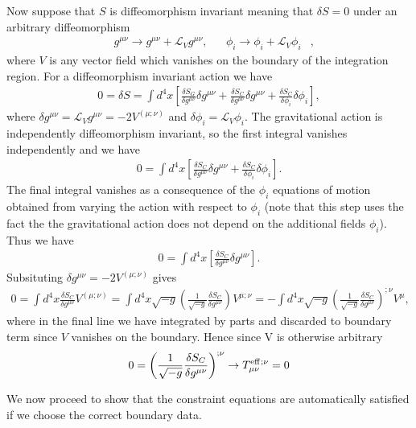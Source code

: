 \documentclass[aps,prd,amsmath,showpacs,amssymb,superscriptaddress,nofootinbib,longbibliography,eqsecnum,preprintnumbers]{revtex4-1}
\begin{document}
Now suppose that $S$ is diffeomorphism invariant meaning that $\delta S =0$ under an arbitrary diffeomorphism
\begin{align}
&g^{\mu \nu}\to g^{\mu \nu} +\mathcal {L}_{V}g^{\mu \nu},& &\phi_i \to \phi_i +\mathcal{L}_V \phi_i&,
\end{align}
where $V$ is any vector field which vanishes on the boundary of the integration region. For a diffeomorphism invariant action we have
\begin{align}
0=\delta S=\int d^4 x\left[\frac{\delta S_G}{\delta g^{\mu \nu}}\delta g^{\mu \nu}+\frac{\delta S_C}{\delta g^{\mu \nu}}\delta g^{\mu \nu}+\frac{\delta S_C}{\delta \phi_i}\delta \phi_i\right],
\end{align}
where $\delta g^{\mu \nu}=\mathcal{L}_V g^{\mu \nu}=-2V^{(\mu;\nu)}$ and $\delta \phi_i =\mathcal{L}_V \phi_i$.
The gravitational action is independently diffeomorphism invariant, so the first integral vanishes independently and we have 
\begin{align}
0=\int d^4 x\left[\frac{\delta S_C}{\delta g^{\mu \nu}}\delta g^{\mu \nu}+\frac{\delta S_C}{\delta \phi_i}\delta \phi_i\right].
\end{align}
The final integral vanishes as a consequence of the $\phi_i$ equations of motion obtained from varying the action with respect to $\phi_i$ (note that this step uses the fact the the gravitational action does not depend on the additional fields $\phi_i$). Thus we have
\begin{align}
0=\int d^4 x\left[\frac{\delta S_C}{\delta g^{\mu \nu}}\delta g^{\mu \nu}\right].
\end{align}
Subsituting  $\delta g^{\mu \nu}=-2V^{(\mu;\nu)}$ gives
\begin{align}
0=\int d^4 x \frac{\delta S_C}{\delta g^{\mu \nu}}V^{(\mu;\nu)}=\int d^4 x\sqrt{-g}\left(\frac{1}{\sqrt{-g}}\frac{\delta S_C}{\delta g^{\mu \nu}}\right) V^{\mu;\nu}=-\int d^4 x\sqrt{-g}\left(\frac{1}{\sqrt{-g}}\frac{\delta S_C}{\delta g^{\mu \nu}}\right)^{;\nu} V^{\mu},
\end{align}
where in the final line we have integrated by parts and discarded to boundary term since $V$ vanishes on the boundary. Hence since V is otherwise arbitrary 
\begin{align}
0= \left(\frac{1}{\sqrt{-g}}\frac{\delta S_C}{\delta g^{\mu \nu}}\right)^{;\nu}  \to T_{\mu \nu}^{\rm eff}{}^{;\nu}=0
\end{align}

We now proceed to show that the constraint equations are automatically satisfied if we choose the correct boundary data.
\end{document}
